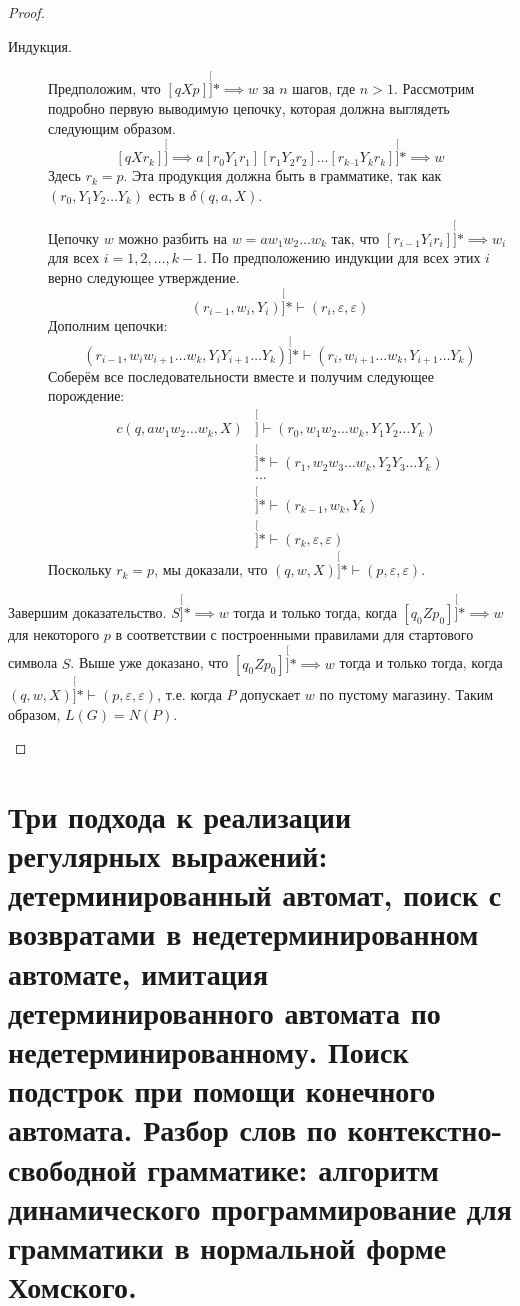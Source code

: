 \documentclass[a4paper,12pt]{article}
\begin{document}
\begin{proof}
\begin{description}
\begin{description}
			\item[Индукция.] Предположим, что \([qXp] \stackrel[]{*}{\implies} w\) за \(n\) шагов, где \(n > 1\). Рассмотрим подробно первую выводимую цепочку, которая должна выглядеть следующим образом.
			\[[q X r_k] \stackrel[]{}{\implies}  a[r_0 Y_1 r_1][r_1 Y_2 r_2]...[r_{k–1} Y_k r_k] \stackrel[]{*}{\implies} w \]
			Здесь \(r_k = p\). Эта продукция должна быть в грамматике, так как \((r_0, Y_1 Y_2 \ldots Y_k)\) есть в \(\delta(q, a, X)\). 
			
			Цепочку \(w\) можно разбить на \(w = a w_1 w_2 \ldots w_k\) так, что \([r_{i - 1} Y_i r_{i}] \stackrel[]{*}{\implies} w_i\) для всех \(i = 1, 2, \ldots, k - 1\). По предположению индукции для всех этих \(i\) верно следующее утверждение.
			\[(r_{i - 1}, w_{i}, Y_{i}) \stackrel[]{*}{\vdash} (r_i, \varepsilon, \varepsilon)\]
			Дополним цепочки:
			\[(r_{i - 1}, w_{i} w_{i + 1} \ldots w_{k}, Y_{i}Y_{i + 1} \ldots Y_{k}) \stackrel[]{*}{\vdash} (r_i, w_{i + 1} \ldots w_{k}, Y_{i + 1} \ldots Y_{k})\]
			Соберём все последовательности вместе и получим следующее порождение:
			\[\begin{aligned}{c}
			(q, a w_1 w_2 \ldots w_k, X) & \stackrel[]{}{\vdash} (r_0, w_1 w_2 \ldots w_k, Y_{1}Y_{2} \ldots Y_{k}) \\
			& \stackrel[]{*}{\vdash} (r_1, w_2 w_3 \ldots w_k, Y_{2}Y_{3} \ldots Y_{k}) \\
			& \ldots \\
			& \stackrel[]{*}{\vdash} (r_{k - 1}, w_k, Y_{k}) \\ 
			& \stackrel[]{*}{\vdash} (r_k, \varepsilon, \varepsilon)
			\end{aligned}\]
			Поскольку \(r_k = p\), мы доказали, что \((q, w, X) \stackrel[]{*}{\vdash} (p, \varepsilon, \varepsilon)\).
		\end{description}
		
		Завершим доказательство. \(S \stackrel[]{*}{\implies} w\) тогда и только тогда, когда \([q_0 Z p_0] \stackrel[]{*}{\implies} w\) для некоторого \(p\) в соответствии с построенными правилами для стартового символа \(S\). Выше уже доказано, что \([q_0 Z p_0] \stackrel[]{*}{\implies} w\) тогда и только тогда, когда \((q, w, X) \stackrel[]{*}{\vdash} (p, \varepsilon, \varepsilon)\), т.е. когда \(P\) допускает \(w\) по пустому магазину. Таким образом, \(L(G) = N(P)\).
	\end{description}
\end{proof}

\newpage
\section{Три подхода к реализации регулярных выражений: детерминированный автомат, поиск с возвратами в недетерминированном автомате, имитация детерминированного автомата по недетерминированному. Поиск подстрок при помощи конечного автомата. Разбор слов по контекстно-свободной грамматике: алгоритм динамического программирование для грамматики в нормальной форме Хомского.}
\end{document}
